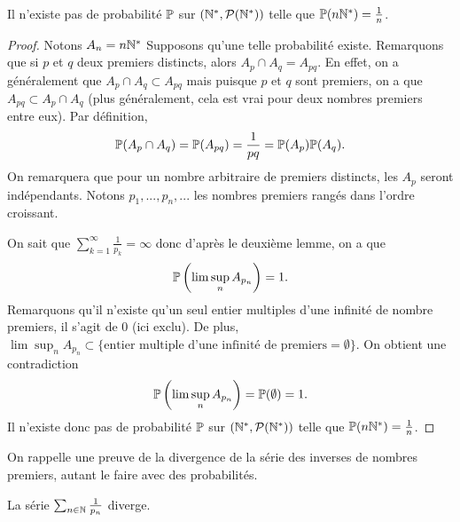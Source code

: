 \documentclass[../main.tex]{subfiles}
\begin{document}
\begin{proposition} Il n'existe pas de probabilité \(\mathbb{P}\) sur \((\mathbb{N}^*,\mathcal{P}(\mathbb{N}^*))\) telle que \(\mathbb{P}(n\mathbb{N}^*) = \frac{1}{n}\).
\end{proposition}
\begin{proof}
    Notons \(A_n = n\mathbb{N}^*\)
    Supposons qu'une telle probabilité existe. Remarquons que si \(p\) et \(q\) deux premiers distincts, alors 
    \(A_p\cap A_q = A_{pq}\). En effet, on a généralement que \(A_p\cap A_q \subset A_{pq}\) mais puisque
    \(p\) et \(q\) sont premiers, on a que \(A_{pq} \subset A_p\cap A_q\) (plus généralement, cela est vrai pour deux nombres premiers entre eux).
    Par définition,
    \begin{equation}
        \mathbb{P}(A_p\cap A_q) = \mathbb{P}(A_{pq}) = \frac{1}{pq} = \mathbb{P}(A_p)\mathbb{P}(A_q).
    \end{equation}
    On remarquera que pour un nombre arbitraire de premiers distincts, les \(A_p\) seront indépendants.
    Notons \(p_1,...,p_n,...\) les nombres premiers rangés dans l'ordre croissant.

    On sait que \(\sum_{k=1}^\infty \frac{1}{p_k} = \infty\) donc d'après le deuxième lemme, on a que 
    \begin{equation}
        \mathbb{P}\left(\lim\sup_n A_{p_n}\right) = 1.
    \end{equation}
    Remarquons qu'il n'existe qu'un seul entier multiples d'une infinité de nombre premiers, il s'agit de \(0\) (ici exclu).
    De plus, \(\lim\sup_n A_{p_n} \subset \{\text{entier multiple d'une infinité de premiers} = \emptyset\}\). On obtient une contradiction
    \begin{equation}
        \mathbb{P}\left(\lim\sup_n A_{p_n}\right)=\mathbb{P}(\emptyset) = 1.
    \end{equation}
    Il n'existe donc pas de probabilité \(\mathbb{P}\) sur \((\mathbb{N}^*,\mathcal{P}(\mathbb{N}^*))\) telle que \(\mathbb{P}(n\mathbb{N}^*) = \frac{1}{n}\).
\end{proof}
On rappelle une preuve de la divergence de la série des inverses de nombres premiers,
autant le faire avec des probabilités.
\begin{proposition}
    La série \(\sum_{n\in\mathbb{N}}\frac{1}{p_n}\) diverge.
\end{proposition}
\end{document}
